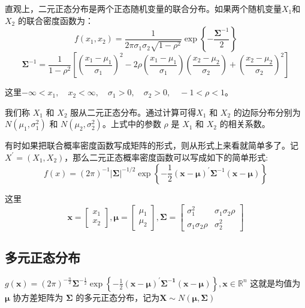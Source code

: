 直观上，二元正态分布是两个正态随机变量的联合分布。如果两个随机变量$ X_{1} $和$ X_{2}$ 的联合密度函数为：
$$ f\left(x_{1}, x_{2}\right)=\frac{1}{2 \pi \sigma_{1} \sigma_{2} \sqrt{1-\rho^{2}}} 
            \exp \left\{-\frac{ \boldsymbol{\Sigma}^{-1}}{2}\right\} $$
$$ {\boldsymbol{\Sigma}}^{-1}=\frac{1}{1-\rho^{2}}\left[\left(\frac{x_{1}-\mu_{1}}{\sigma_{1}}\right)^{2}-2 \rho\left(\frac{x_{1}-\mu_{1}}{\sigma_{1}}\right)\left(\frac{x_{2}-\mu_{2}}{\sigma_{2}}\right)+\left(\frac{x_{2}-\mu_{2}}{\sigma_{2}}\right)^{2}\right]  $$

这里$ -\infty<x_{1}, \quad x_{2}<\infty, \quad \sigma_{1}>0, \quad \sigma_{2}>0, \quad-1<\rho<1 $。

我们称 $ X_{1} $ 和 $ X_{2} $ 服从二元正态分布。通过计算可得$ X_{1} $ 和 $ X_{2} $ 的边际分布分别为 $N (\mu_{1},\sigma_{1}^{2})$
和 $N (\mu_{2},\sigma_{2}^{2})$。上式中的参数 $ \rho $ 是 $ X_{1} $ 和 $ X_{2} $  的相关系数。

有时如果把联合概率密度函数写成矩阵的形式，则从形式上来看就简单多了。记 $ X^{\prime} = ( X_{1}, X_{2} ) $，那么二元正态概率密度函数可以写成如下的简单形式:
$$ f(x)=(2 \pi)^{-1}|\boldsymbol{\Sigma}|^{-1 / 2} \exp \left\{-\frac{1}{2}(\boldsymbol{x-\mu})^{\prime} \boldsymbol{\Sigma}^{-1}(\boldsymbol{x-\mu})\right\} $$

这里
$$ \boldsymbol{x}=\left[\begin{array}{l}
    x_{1} \\
    x_{2}
    \end{array}\right], \boldsymbol{\mu}=\left[\begin{array}{l}
    \mu_{1} \\
    \mu_{2}
    \end{array}\right], \boldsymbol{\Sigma}=\left[\begin{array}{cc}
    \sigma_{1}^{2} & \sigma_{1} \sigma_{2} \rho \\
    \sigma_{1} \sigma_{2} \rho & \sigma_{2}^{2}
    \end{array}\right] $$

\subsection{多元正态分布}
$ g(\boldsymbol{x})=(2 \pi)^{-\frac{n}{2}} \boldsymbol{\Sigma} ^{-\frac{1}{2}} \exp 
\left\{-\frac{1}{2}\boldsymbol{(x-\mu)^{\prime} \Sigma^{-1}(x-\mu)}\right\}, \boldsymbol{x} \in \mathbb{R}^{n} $
这就是均值为 $ \boldsymbol{\mu} $ 协方差矩阵为 $ \boldsymbol{\Sigma} $ 的多元正态分布，记为$ \boldsymbol{X} \sim N(\boldsymbol{\mu, \Sigma})$

